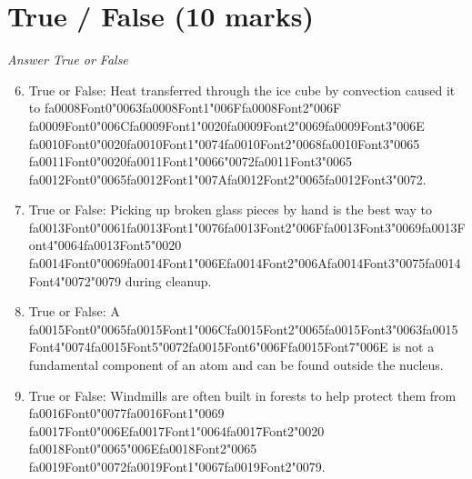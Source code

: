 \documentclass[12pt]{article}
\begin{document}
\section*{True / False (10 marks)}
\textit{Answer True or False}
\begin{enumerate}[label=\arabic*.]
\setcounter{enumi}{5}
\item True or False: Heat transferred through the ice cube by convection caused it to {\csname fa0008Font0\endcsname\char"0063}{\csname fa0008Font1\endcsname\char"006F}{\csname fa0008Font2\endcsname\char"006F} {\csname fa0009Font0\endcsname\char"006C}{\csname fa0009Font1\endcsname\char"0020}{\csname fa0009Font2\endcsname\char"0069}{\csname fa0009Font3\endcsname\char"006E} {\csname fa0010Font0\endcsname\char"0020}{\csname fa0010Font1\endcsname\char"0074}{\csname fa0010Font2\endcsname\char"0068}{\csname fa0010Font3\endcsname\char"0065} {\csname fa0011Font0\endcsname\char"0020}{\csname fa0011Font1\endcsname\char"0066}{\char"0072}{\csname fa0011Font3\endcsname\char"0065} {\csname fa0012Font0\endcsname\char"0065}{\csname fa0012Font1\endcsname\char"007A}{\csname fa0012Font2\endcsname\char"0065}{\csname fa0012Font3\endcsname\char"0072}.
\item True or False: Picking up broken glass pieces by hand is the best way to {\csname fa0013Font0\endcsname\char"0061}{\csname fa0013Font1\endcsname\char"0076}{\csname fa0013Font2\endcsname\char"006F}{\csname fa0013Font3\endcsname\char"0069}{\csname fa0013Font4\endcsname\char"0064}{\csname fa0013Font5\endcsname\char"0020} {\csname fa0014Font0\endcsname\char"0069}{\csname fa0014Font1\endcsname\char"006E}{\csname fa0014Font2\endcsname\char"006A}{\csname fa0014Font3\endcsname\char"0075}{\csname fa0014Font4\endcsname\char"0072}{\char"0079} during cleanup.
\item True or False: A {\csname fa0015Font0\endcsname\char"0065}{\csname fa0015Font1\endcsname\char"006C}{\csname fa0015Font2\endcsname\char"0065}{\csname fa0015Font3\endcsname\char"0063}{\csname fa0015Font4\endcsname\char"0074}{\csname fa0015Font5\endcsname\char"0072}{\csname fa0015Font6\endcsname\char"006F}{\csname fa0015Font7\endcsname\char"006E} is not a fundamental component of an atom and can be found outside the nucleus.
\item True or False: Windmills are often built in forests to help protect them from {\csname fa0016Font0\endcsname\char"0077}{\csname fa0016Font1\endcsname\char"0069} {\csname fa0017Font0\endcsname\char"006E}{\csname fa0017Font1\endcsname\char"0064}{\csname fa0017Font2\endcsname\char"0020} {\csname fa0018Font0\endcsname\char"0065}{\char"006E}{\csname fa0018Font2\endcsname\char"0065} {\csname fa0019Font0\endcsname\char"0072}{\csname fa0019Font1\endcsname\char"0067}{\csname fa0019Font2\endcsname\char"0079}.

\end{enumerate}
\end{document}
